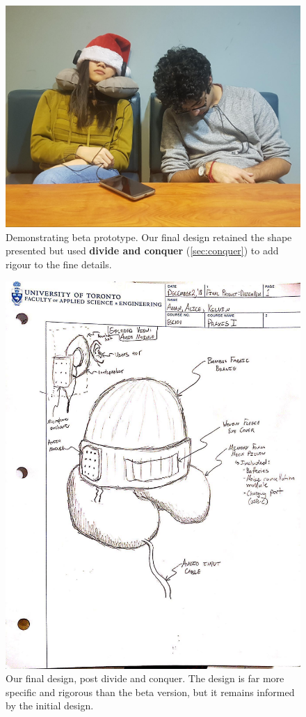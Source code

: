 \documentclass[a4paper,12pt]{article}
\begin{document}
\begin{figure}[H]
\centering
\includegraphics[width=1\textwidth]{img/image002.jpg}
\caption{Demonstrating beta prototype. Our final design retained the shape presented but used \textbf{divide and conquer} (\ref{sec:conquer}) to add rigour to the fine details.}
\label{}
\end{figure}

\begin{figure}[H]
\centering
\includegraphics[width=1\textwidth]{img/image003.jpg}
\caption{Our final design, post divide and conquer. The design is far more specific and rigorous than the beta version, but it remains informed by the initial design.}
\label{}
\end{figure}
\end{document}
